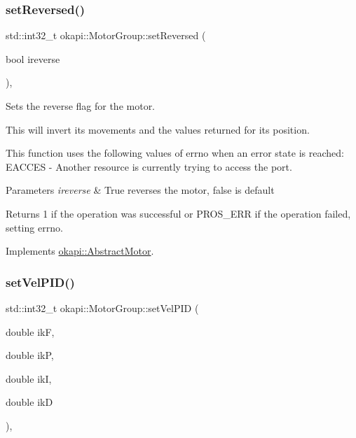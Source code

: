 \subsubsection{\texorpdfstring{setReversed()}{setReversed()}}
{\footnotesize\ttfamily std\+::int32\+\_\+t okapi\+::\+Motor\+Group\+::set\+Reversed (\begin{DoxyParamCaption}\item[{bool}]{ireverse }\end{DoxyParamCaption})\hspace{0.3cm}{\ttfamily [override]}, {\ttfamily [virtual]}}

Sets the reverse flag for the motor.

This will invert its movements and the values returned for its position.

This function uses the following values of errno when an error state is reached\+: E\+A\+C\+C\+ES -\/ Another resource is currently trying to access the port.


\begin{DoxyParams}{Parameters}
{\em ireverse} & True reverses the motor, false is default \\
\hline
\end{DoxyParams}
\begin{DoxyReturn}{Returns}
1 if the operation was successful or P\+R\+O\+S\+\_\+\+E\+RR if the operation failed, setting errno. 
\end{DoxyReturn}


Implements \mbox{\hyperlink{classokapi_1_1AbstractMotor_a72a6a4eb9d237ad57b92401b08ad64fa}{okapi\+::\+Abstract\+Motor}}.

\mbox{\label{classokapi_1_1MotorGroup_a719abeb463faa5a01d0a22148f2d6d9e}} 
\subsubsection{\texorpdfstring{setVelPID()}{setVelPID()}}
{\footnotesize\ttfamily std\+::int32\+\_\+t okapi\+::\+Motor\+Group\+::set\+Vel\+P\+ID (\begin{DoxyParamCaption}\item[{double}]{ikF,  }\item[{double}]{ikP,  }\item[{double}]{ikI,  }\item[{double}]{ikD }\end{DoxyParamCaption})\hspace{0.3cm}{\ttfamily [override]}, {\ttfamily [virtual]}}


